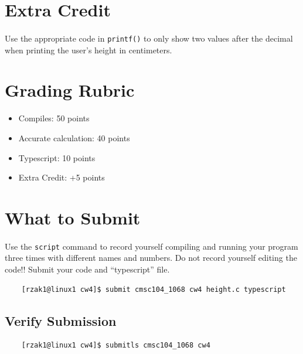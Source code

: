 \documentclass[letter,11pt]{article}
\begin{document}
\section*{Extra Credit}
\paragraph{}Use the appropriate code in \texttt{printf()} to only show two values after the decimal when printing the user's height in centimeters.

\section*{Grading Rubric}
\begin{itemize}
    \item Compiles: 50 points
    \item Accurate calculation: 40 points
    \item Typescript: 10 points
    \item Extra Credit: +5 points
\end{itemize}

\section*{What to Submit}
\paragraph{}Use the \texttt{script} command to record yourself compiling and running your program three times with different names and numbers. Do not record yourself editing the code!! Submit your code and ``typescript'' file.
\begin{verbatim}
    [rzak1@linux1 cw4]$ submit cmsc104_1068 cw4 height.c typescript
\end{verbatim}

\subsection*{Verify Submission}
\begin{verbatim}
    [rzak1@linux1 cw4]$ submitls cmsc104_1068 cw4
\end{verbatim}
\end{document}
